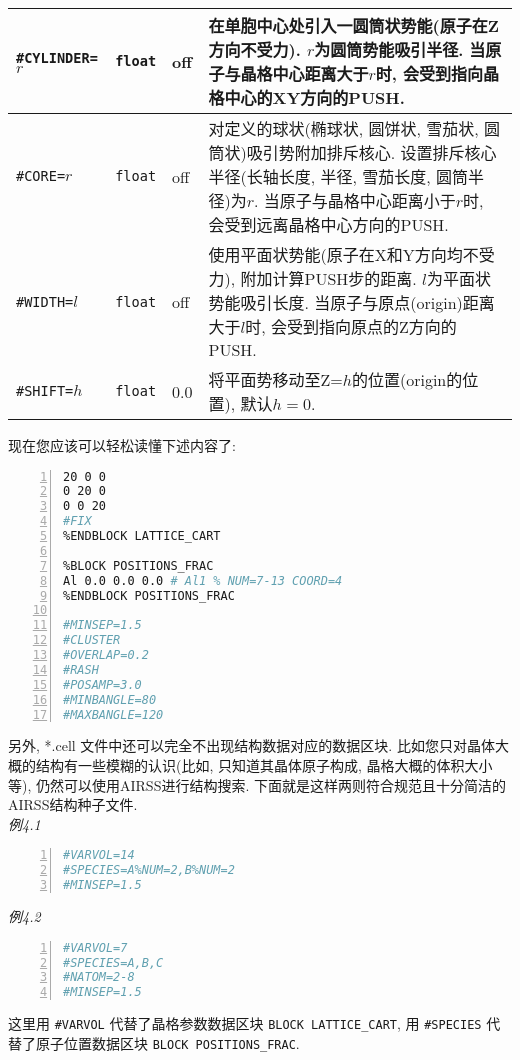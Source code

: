 \documentclass[a4paper, 10pt]{article}
\begin{document}
\begin{center}
\begin{longtable}{m{11em}|m{4em}<{\centering}|m{3em}<{\centering}|m{15em}}
\midrule
\verb|#CYLINDER=|\(r\) & \verb|float| & off & 在单胞中心处引入一圆筒状势能(原子在Z方向不受力). \(r\)为圆筒势能吸引半径. 当原子与晶格中心距离大于\(r\)时, 会受到指向晶格中心的XY方向的PUSH.\\
\midrule
\verb|#CORE=|\(r\) & \verb|float| & off & 对定义的球状(椭球状, 圆饼状, 雪茄状, 圆筒状)吸引势附加排斥核心. 设置排斥核心半径(长轴长度, 半径, 雪茄长度, 圆筒半径)为\(r\). 当原子与晶格中心距离小于\(r\)时, 会受到远离晶格中心方向的PUSH.\\
\midrule
\verb|#WIDTH=|\(l\)& \verb|float| & off & 使用平面状势能(原子在X和Y方向均不受力), 附加计算PUSH步的距离. \(l\)为平面状势能吸引长度. 当原子与原点(origin)距离大于\(l\)时, 会受到指向原点的Z方向的PUSH.\\
\midrule
\verb|#SHIFT=|\(h\)& \verb|float|& 0.0  & 将平面势移动至Z=\(h\)的位置(origin的位置), 默认\(h=0\).\\
\bottomrule
\end{longtable}
\end{center}

\newpage
现在您应该可以轻松读懂下述内容了:

\begin{lstlisting}[language={bash},numbers=left]
%BLOCK LATTICE_CART
20 0 0
0 20 0
0 0 20
#FIX
%ENDBLOCK LATTICE_CART

%BLOCK POSITIONS_FRAC
Al 0.0 0.0 0.0 # Al1 % NUM=7-13 COORD=4
%ENDBLOCK POSITIONS_FRAC

#MINSEP=1.5
#CLUSTER
#OVERLAP=0.2
#RASH
#POSAMP=3.0
#MINBANGLE=80
#MAXBANGLE=120
\end{lstlisting}

另外, *.cell 文件中还可以完全不出现结构数据对应的数据区块. 比如您只对晶体大概的结构有一些模糊的认识(比如, 只知道其晶体原子构成, 晶格大概的体积大小等), 仍然可以使用AIRSS进行结构搜索. 下面就是这样两则符合规范且十分简洁的AIRSS结构种子文件.\\
\emph{例4.1}
\begin{lstlisting}[language={bash},numbers=left]
#VARVOL=14
#SPECIES=A%NUM=2,B%NUM=2
#MINSEP=1.5
\end{lstlisting}
\emph{例4.2}
\begin{lstlisting}[language={bash},numbers=left]
#VARVOL=7
#SPECIES=A,B,C
#NATOM=2-8
#MINSEP=1.5        
\end{lstlisting}

这里用 \verb|#VARVOL| 代替了晶格参数数据区块 \verb|BLOCK LATTICE_CART|, 用 \verb|#SPECIES| 代替了原子位置数据区块 \verb|BLOCK POSITIONS_FRAC|.

\newpage
\end{document}
